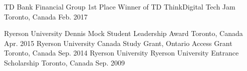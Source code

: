 \begin{cvhonors}
  \cvhonor
    {TD Bank Financial Group}
    {1st Place Winner of TD ThinkDigital Tech Jam}
    {Toronto, Canada}
    {Feb. 2017}
\end{cvhonors}

\begin{cvhonors}
  \cvhonor
    {Ryerson University}
    {Dennis Mock Student Leadership Award}
    {Toronto, Canada}
    {Apr. 2015}
  \cvhonor
    {Ryerson University}
    {Canada Study Grant, Ontario Access Grant}
    {Toronto, Canada}
    {Sep. 2014}
  \cvhonor
    {Ryerson University}
    {Ryerson University Entrance Scholarship}
    {Toronto, Canada}
    {Sep. 2009}
\end{cvhonors}

